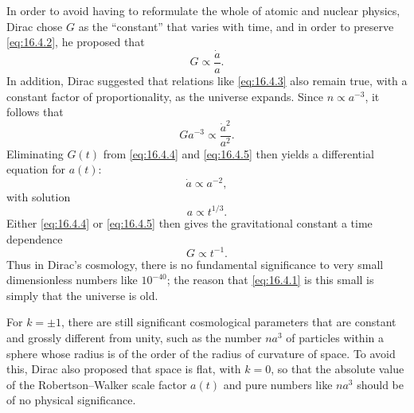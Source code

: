In order to avoid having to reformulate the whole of atomic and nuclear physics,
Dirac chose \(G\) as the ``constant'' that varies with time, and in order to
preserve \eqref{eq:16.4.2}, he proposed that
\begin{equation}
  G\propto\frac{\dot a}{a}.
  \tag{16.4.4}\label{eq:16.4.4}
\end{equation}
In addition, Dirac suggested that relations like \eqref{eq:16.4.3} also remain
true, with a constant factor of proportionality, as the universe expands. Since
\(n\propto a^{-3}\), it follows that
\begin{equation}
  Ga^{-3}\propto\frac{\dot a^2}{a^2}.
  \tag{16.4.5}\label{eq:16.4.5}
\end{equation}
Eliminating \(G(t)\) from \eqref{eq:16.4.4} and \eqref{eq:16.4.5} then
yields a differential equation for \(a(t)\):
\[
  \dot a\propto a^{-2},
\]
with solution
\begin{equation}
  a\propto t^{1/3}.
  \tag{16.4.6}\label{eq:16.4.6}
\end{equation}
Either \eqref{eq:16.4.4} or \eqref{eq:16.4.5} then gives the gravitational
constant a time dependence
\begin{equation}
  G\propto t^{-1}.
  \tag{16.4.7}\label{eq:16.4.7}
\end{equation}
Thus in Dirac's cosmology, there is no fundamental significance to very small
dimensionless numbers like \(10^{-40}\); the reason that
\eqref{eq:16.4.1} is this small is simply that the universe is old.

For \(k=\pm1\), there are still significant cosmological parameters that are
constant and grossly different from unity, such as the number \(na^3\) of
particles within a sphere whose radius is of the order of the radius of
curvature of space. To avoid this, Dirac also proposed that space is flat, with
\(k=0\), so that the absolute value of the Robertson--Walker scale factor
\(a(t)\) and pure numbers like \(na^3\) should be of no physical significance.

